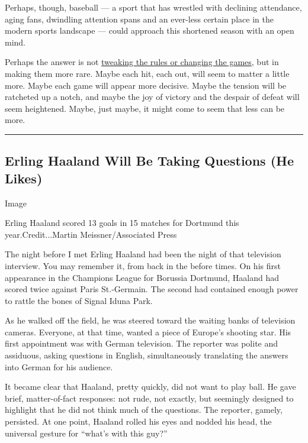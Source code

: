 Perhaps, though, baseball --- a sport that has wrestled with declining
attendance, aging fans, dwindling attention spans and an ever-less
certain place in the modern sports landscape --- could approach this
shortened season with an open mind.

Perhaps the answer is not
\href{https://www.nytimes.com/interactive/2020/07/21/sports/coronavirus-changes-baseball-nba-nfl.html}{tweaking
the rules or changing the games}, but in making them more rare. Maybe
each hit, each out, will seem to matter a little more. Maybe each game
will appear more decisive. Maybe the tension will be ratcheted up a
notch, and maybe the joy of victory and the despair of defeat will seem
heightened. Maybe, just maybe, it might come to seem that less can be
more.

\begin{center}\rule{0.5\linewidth}{\linethickness}\end{center}

\hypertarget{erling-haaland-will-be-taking-questions-he-likes}{%
\subsection{Erling Haaland Will Be Taking Questions (He
Likes)}\label{erling-haaland-will-be-taking-questions-he-likes}}

Image

Erling Haaland scored 13 goals in 15 matches for Dortmund this
year.Credit...Martin Meissner/Associated Press

The night before I met Erling Haaland had been the night of that
television interview. You may remember it, from back in the before
times. On his first appearance in the Champions League for Borussia
Dortmund, Haaland had scored twice against Paris St.-Germain. The second
had contained enough power to rattle the bones of Signal Iduna Park.

As he walked off the field, he was steered toward the waiting banks of
television cameras. Everyone, at that time, wanted a piece of Europe's
shooting star. His first appointment was with German television. The
reporter was polite and assiduous, asking questions in English,
simultaneously translating the answers into German for his audience.

It became clear that Haaland, pretty quickly, did not want to play ball.
He gave brief, matter-of-fact responses: not rude, not exactly, but
seemingly designed to highlight that he did not think much of the
questions. The reporter, gamely, persisted. At one point, Haaland rolled
his eyes and nodded his head, the universal gesture for ``what's with
this guy?''

